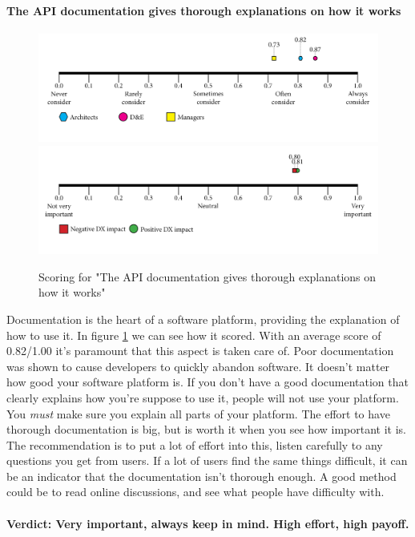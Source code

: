     \paragraph{The API documentation gives thorough explanations on how it works}
    \begin{figure}[H]
        \centering
        \includegraphics[width=\linewidth]{scorelines/aspect3.png}
        \includegraphics[width=\linewidth]{dxscorelines/dxaspect3.png}
        \caption{Scoring for "The API documentation gives thorough explanations on how it works"}
        \label{fig:aspect3}
    \end{figure}
    Documentation is the heart of a software platform, providing the explanation of how to use it. In figure \ref{fig:aspect3} we can see how it scored. With an average score of 0.82/1.00 it's paramount that this aspect is taken care of. Poor documentation was shown to cause developers to quickly abandon software. It doesn't matter how good your software platform is. If you don't have a good documentation that clearly explains how you're suppose to use it, people will not use your platform. You \textit{must} make sure you explain all parts of your platform. The effort to have thorough documentation is big, but is worth it when you see how important it is. The recommendation is to put a lot of effort into this, listen carefully to any questions you get from users. If a lot of users find the same things difficult, it can be an indicator that the documentation isn't thorough enough. A good method could be to read online discussions, and see what people have difficulty with.\\ \\
    \textbf{Verdict: Very important, always keep in mind. High effort, high payoff.}
